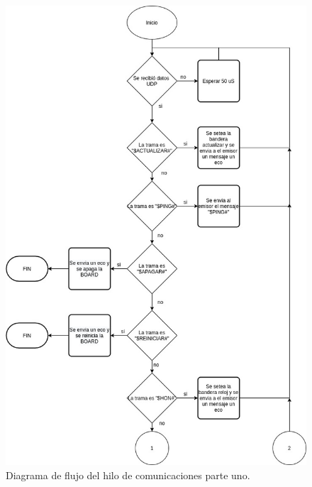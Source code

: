 \begin{figure}[htpb]
	\centering
	\includegraphics[scale=0.6]{Figures/hilo2parte1.jpg}  
	\caption{Diagrama de flujo del hilo de comunicaciones parte uno.}
	\label{fig: hilocomparte1}
\end{figure}

